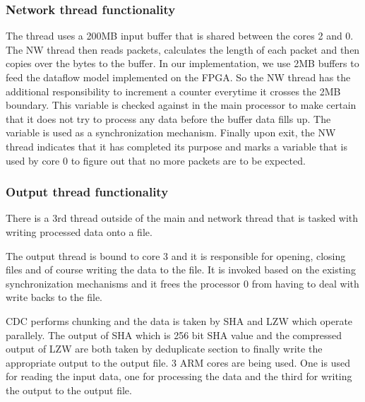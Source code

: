 \documentclass{article}
\begin{document}
\subsubsection{Network thread functionality} 
\newline\newline
The thread uses a 200MB input buffer that is shared between the cores 2 and 0.
\newline
The NW thread then reads packets, calculates the length of each packet and then copies over the bytes to the buffer.
\newline
In our implementation, we use 2MB buffers to feed the dataflow model implemented on the FPGA.
\newline
So the NW thread has the additional responsibility to increment a counter everytime it crosses the 2MB boundary. 
This variable is checked against in the main processor to make certain that it does not try to process any data before the buffer data fills up. The variable is used as a synchronization mechanism.
\newline
Finally upon exit, the NW thread indicates that it has completed its purpose and marks a variable that is used by core 0 to figure out that no more packets are to be expected.
\newline

\subsubsection{Output thread functionality}
\newline\newline
There is a 3rd thread outside of the main and network thread that is tasked with writing processed data onto a file. 
\par
The output thread is bound to core 3 and it is responsible for opening, closing files and of course writing the data to the file. 
It is invoked based on the existing synchronization mechanisms and it frees the processor 0 from having to deal with write backs to the file. 
\newline

CDC performs chunking and the data is taken by SHA and LZW which operate parallely. The output of SHA which is 256 bit SHA value and the compressed output of LZW are both taken by deduplicate section to finally write the appropriate output to the output file. 
3 ARM cores are being used. One is used for reading the input data, one for processing the data and the third for writing the output to the output file.  
\end{document}
